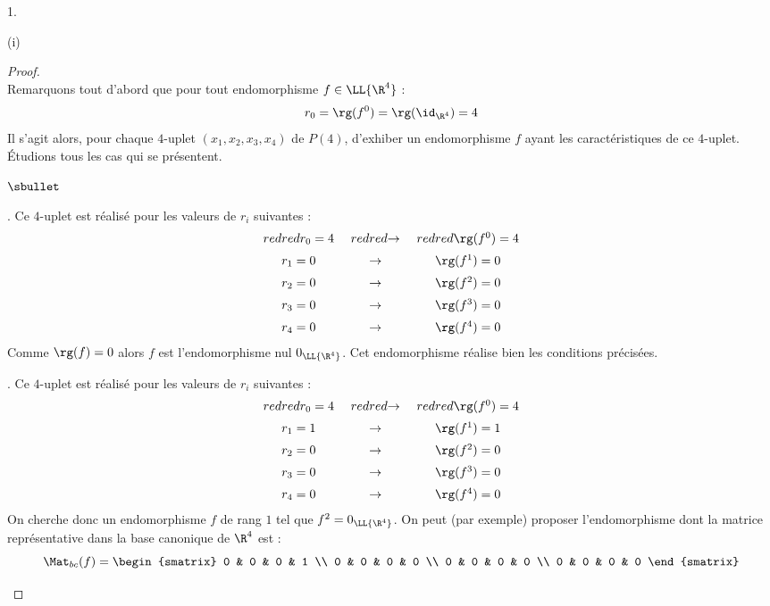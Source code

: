 \documentclass[11pt]{article}%
\begin{document}
\begin{noliste}{1.}
\begin{noliste}{(i)}
      \begin{proof}~\\%
        Remarquons tout d'abord que pour tout endomorphisme $f \in
        \LL{\R^4}$ : 
        \[
        r_0 = \rg(f^0) = \rg(\id_{\R^4}) = 4
        \]
        Il s'agit alors, pour chaque $4$-uplet $(x_1, x_2, x_3, x_4)$
        de $P(4)$, d'exhiber un endomorphisme $f$ ayant les
        caractéristiques de ce $4$-uplet. Étudions tous les cas qui se
        présentent.
        \begin{noliste}{$\sbullet$}
        \item {}. Ce
          $4$-uplet est réalisé pour les valeurs de $r_i$ suivantes :
          \[
          \begin{array}{c@{\ \quad}c@{\ \quad}c}
            \color{red}{r_0 = 4} & \color{red}{\rightarrow} &
            \color{red}{\rg(f^0) = 4} \\[.2cm] 
            r_1 = 0 & \rightarrow & \rg(f^1) = 0 \\[.2cm]
            r_2 = 0 & \rightarrow & \rg(f^2) = 0 \\[.2cm]
            r_3 = 0 & \rightarrow & \rg(f^3) = 0 \\[.2cm]
            r_4 = 0 & \rightarrow & \rg(f^4) = 0 
          \end{array}
          \]
          Comme $\rg(f) = 0$ alors $f$ est l'endomorphisme nul
          $0_{\LL{\R^4}}$. Cet endomorphisme réalise bien les
          conditions précisées.

        \item {}. Ce
          $4$-uplet est réalisé pour les valeurs de $r_i$ suivantes :
          \[
          \begin{array}{c@{\ \quad}c@{\ \quad}c}
            \color{red}{r_0 = 4} & \color{red}{\rightarrow} &
            \color{red}{\rg(f^0) = 4} \\[.2cm] 
            r_1 = 1 & \rightarrow & \rg(f^1) = 1 \\[.2cm]
            r_2 = 0 & \rightarrow & \rg(f^2) = 0 \\[.2cm]
            r_3 = 0 & \rightarrow & \rg(f^3) = 0 \\[.2cm]
            r_4 = 0 & \rightarrow & \rg(f^4) = 0 
          \end{array}
          \]
          On cherche donc un endomorphisme $f$ de rang $1$ tel que
          $f^2 = 0_{\LL{\R^4}}$. On peut (par exemple) proposer
          l'endomorphisme dont la matrice représentative dans la base
          canonique de $\R^4$ est :
          \[
          \Mat_{bc}(f) =
          \begin{smatrix}
            0 & 0 & 0 & 1 \\
            0 & 0 & 0 & 0 \\
            0 & 0 & 0 & 0 \\
            0 & 0 & 0 & 0 
          \end{smatrix}
          \]


\end{noliste}
\end{proof}
\end{noliste}
\end{noliste}
\end{document}
